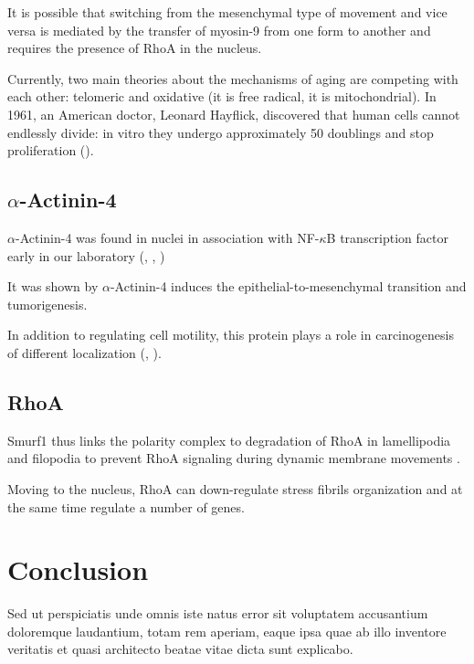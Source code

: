 \documentclass[english,authoryear]{elsarticle}
\begin{document}
It is possible that switching from the mesenchymal type of movement and vice versa is mediated by the transfer of myosin-9 from one form to another and requires the presence of RhoA in the nucleus.

Currently, two main theories about the mechanisms of aging are competing with each other: telomeric and oxidative (it is free radical, it is mitochondrial). In 1961, an American doctor, Leonard Hayflick, discovered that human cells cannot endlessly divide: in vitro they undergo approximately 50 doublings and stop proliferation (\cite{hayflick1961serial}).



\subsection*{$\alpha$-Actinin-4}

$\alpha$-Actinin-4 was found in nuclei in association with NF-$\kappa$B transcription factor early in our laboratory (\cite{babakov2008rela}, \cite{lomert2018co}, \cite{bolshakova2007extra})

It was shown by \cite{an2016alpha} $\alpha$-Actinin-4 induces the epithelial-to-mesenchymal transition and tumorigenesis.

In addition to regulating cell motility, this protein plays a role in carcinogenesis of different localization (\cite{barbolina2008motility}, \cite{hsu2013alpha}).

\subsection*{RhoA}

 Smurf1 thus links the polarity complex to degradation of RhoA in lamellipodia and filopodia to prevent RhoA signaling during dynamic membrane movements \cite{wang2003regulation}.

 Moving to the nucleus, RhoA can down-regulate stress fibrils organization and at the same time regulate a number of genes.


\section*{Conclusion}

Sed ut perspiciatis unde omnis iste natus error sit voluptatem accusantium doloremque laudantium, totam rem aperiam, eaque ipsa quae ab illo inventore veritatis et quasi architecto beatae vitae dicta sunt explicabo.
\end{document}
